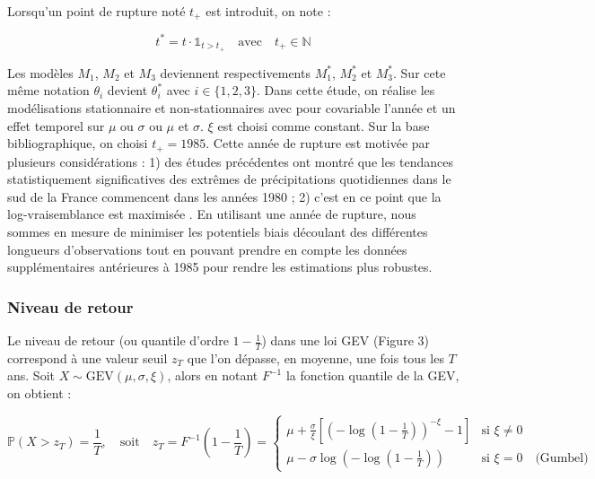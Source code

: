 \documentclass[
  article,
  nofooter,
  noheadings]{jss}
\begin{document}
Lorsqu'un point de rupture noté \(t_+\) est introduit, on note :

\[
t^\ast = t \cdot \mathbb{1}_{t > t_+} \quad \text{avec} \quad t_+ \in \mathbb{N}
\]

Les modèles \(M_1\), \(M_2\) et \(M_3\) deviennent respectivements
\(M_1^\ast\), \(M_2^\ast\) et \(M_3^\ast\). Sur cete même notation
\(\theta_i\) devient \(\theta^\ast_i\) avec \(i \in \{1, 2, 3\}\). Dans
cette étude, on réalise les modélisations stationnaire et
non-stationnaires avec pour covariable l'année et un effet temporel sur
\(\mu\) ou \(\sigma\) ou \(\mu\) et \(\sigma\). \(\xi\) est choisi comme
constant. Sur la base bibliographique, on choisi \(t_+ = 1985\). Cette
année de rupture est motivée par plusieurs considérations : 1) des
études précédentes ont montré que les tendances statistiquement
significatives des extrêmes de précipitations quotidiennes dans le sud
de la France commencent dans les années 1980 \citep{Blanchet2018} ; 2)
c'est en ce point que la log-vraisemblance est maximisée
\citep{blanchet2022instrumental}. En utilisant une année de rupture,
nous sommes en mesure de minimiser les potentiels biais découlant des
différentes longueurs d'observations tout en pouvant prendre en compte
les données supplémentaires antérieures à 1985 pour rendre les
estimations plus robustes.

\subsubsection{Niveau de retour}\label{niveau-de-retour}

Le niveau de retour (ou quantile d'ordre \(1 - \tfrac{1}{T}\)) dans une
loi GEV (Figure 3) correspond à une valeur seuil \(z_T\) que l'on
dépasse, en moyenne, une fois tous les \(T\) ans. Soit
\(X \sim \mathrm{GEV}(\mu, \sigma, \xi)\), alors en notant \(F^{-1}\) la
fonction quantile de la GEV, on obtient :

\begin{tcolorbox}[enhanced jigsaw, leftrule=.75mm, opacityback=0, breakable, toprule=.15mm, colframe=quarto-callout-color-frame, arc=.35mm, colback=white, rightrule=.15mm, bottomrule=.15mm, left=2mm]

\[
\mathbb{P}(X > z_T) = \frac{1}{T}, \quad \text{soit} \quad z_T = F^{-1}\left(1 - \frac{1}{T} \right) = 
\begin{cases}
\mu + \frac{\sigma}{\xi} \left[ \left( -\log\left(1 - \frac{1}{T}\right) \right)^{-\xi} - 1 \right] & \text{si } \xi \ne 0 \\
\mu - \sigma \log \left( -\log\left(1 - \frac{1}{T} \right) \right) & \text{si } \xi = 0 \quad \text{(Gumbel)}
\end{cases}
\]

\end{tcolorbox}
\end{document}
